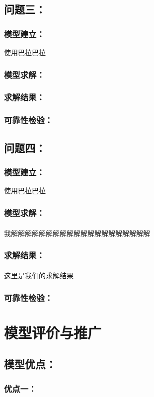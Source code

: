 \documentclass[zihao=-4,UTF8]{article}
\newcommand{\upcite}[1]{\textsuperscript{\cite{#1}}}     %
\begin{document}
\subsection{问题三：}
\subsubsection{模型建立：}
使用巴拉巴拉
\subsubsection{模型求解：}
\subsubsection{求解结果：}
\subsubsection{可靠性检验：}

\subsection{问题四：}
\subsubsection{模型建立：}
使用巴拉巴拉
\subsubsection{模型求解：}
我解解解解解解解解解解解解解解解解解解解解 \upcite{徐晓平}
\subsubsection{求解结果：}
这里是我们的求解结果 \upcite{张春琳}
\subsubsection{可靠性检验：}

\section{模型评价与推广}
\subsection{模型优点：}
\subsubsection{优点一：}
\end{document}
